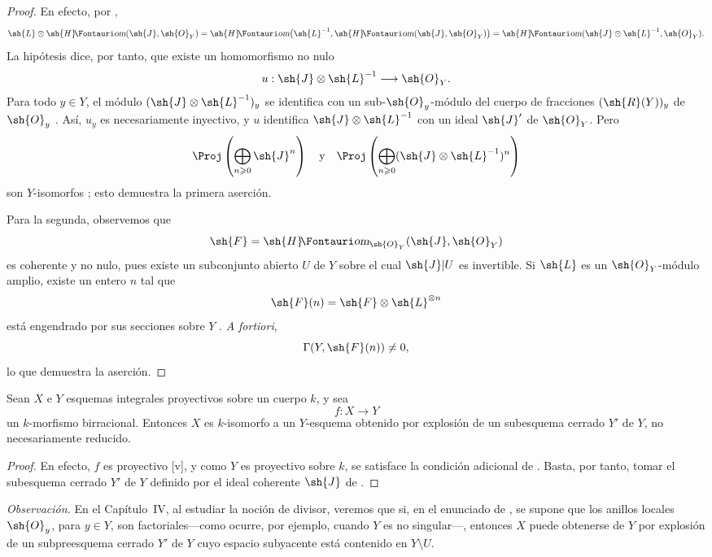 \documentclass[oneside]{amsart}
\makeatletter
\renewcommand{\geq}{\geqslant}
\newcommand*{\ega@sheafop}[3]{\sh{#1}#2\textup{\kern-2.2pt{\Fontauri\slshape #3}}}
\newcommand*{\shHom}{\ega@sheafop{H}{}{om}}
\newcommand{\oldpage}[2][]{{\marginnote{\normalfont\textbf{#1}~|~#2}}\ignorespaces}
\let\EGAOriginalLabel\label
\renewcommand{\label}[1]{\phantomsection\EGAOriginalLabel{#1}}
\makeatother
\begin{document}
\begin{proof}
En efecto, por ,
\[
  \sh{L}\otimes\shHom(\sh{J},\sh{O}_Y)
  =\shHom\bigl(\sh{L}^{-1},\shHom(\sh{J},\sh{O}_Y)\bigr)
  =\shHom(\sh{J}\otimes\sh{L}^{-1},\sh{O}_Y).
\]
La hipótesis dice, por tanto, que existe un homomorfismo no nulo
\[
  u:\sh{J}\otimes\sh{L}^{-1}\longrightarrow\sh{O}_Y.
\]
Para todo $y\in Y$, el módulo $(\sh{J}\otimes\sh{L}^{-1})_y$ se identifica con un sub-$\sh{O}_y$-módulo del cuerpo de fracciones $(\sh{R}(Y))_y$ de $\sh{O}_y$ .
Así, $u_y$ es necesariamente inyectivo, y $u$ identifica $\sh{J}\otimes\sh{L}^{-1}$ con un ideal $\sh{J}'$ de $\sh{O}_Y$.
Pero
\[
  \Proj\left(\bigoplus_{n\geq0}\sh{J}^n\right)
  \quad\text{y}\quad
  \Proj\left(\bigoplus_{n\geq0}
  (\sh{J}\otimes\sh{L}^{-1})^n\right)
\]
son $Y$-isomorfos ; esto demuestra la primera aserción.

Para la segunda, observemos que
\[
  \sh{F}=\shHom_{\sh{O}_Y}(\sh{J},\sh{O}_Y)
\]
es coherente y no nulo, pues existe un subconjunto abierto $U$ de $Y$ sobre el cual $\sh{J}|U$ es invertible.
Si $\sh{L}$ es un $\sh{O}_Y$-módulo amplio, existe un entero $n$ tal que
\[
  \sh{F}(n)=\sh{F}\otimes\sh{L}^{\otimes n}
\]
está engendrado por sus secciones sobre $Y$ .
\emph{A fortiori},
\[
  \Gamma(Y,\sh{F}(n))\neq0,
\]
lo que demuestra la aserción.
\end{proof}

\begin{corollary}[2.3.7]
\label{III.2.3.7}
Sean $X$ e $Y$ esquemas integrales proyectivos sobre un cuerpo $k$, y sea
\[
  f:X\longrightarrow Y
\]
un $k$-morfismo birracional.
Entonces $X$ es $k$-isomorfo a un $Y$-esquema obtenido por explosión de un subesquema cerrado $Y'$ de $Y$, no necesariamente reducido.
\end{corollary}

\begin{proof}
\oldpage[III]{107}
En efecto, $f$ es proyectivo [v], y como $Y$ es proyectivo sobre $k$, se satisface la condición adicional de .
Basta, por tanto, tomar el subesquema cerrado $Y'$ de $Y$ definido por el ideal coherente $\sh{J}$ de .
\end{proof}

\begin{env}[2.3.8]
\label{III.2.3.8}
\emph{Observación.}
En el Capítulo~IV, al estudiar la noción de divisor, veremos que si, en el enunciado de , se supone que los anillos locales $\sh{O}_y$, para $y\in Y$, son factoriales---como ocurre, por ejemplo, cuando $Y$ es no singular---, entonces $X$ puede obtenerse de $Y$ por explosión de un subpreesquema cerrado $Y'$ de $Y$ cuyo espacio subyacente está contenido en $Y\setminus U$.
\end{env}
\end{document}

